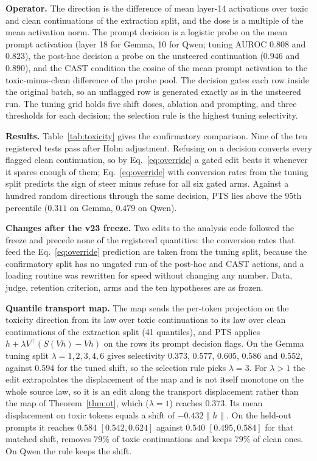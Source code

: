 \textbf{Operator.} The direction is the difference of mean layer-14 activations
over toxic and clean continuations of the extraction split, and the dose is a
multiple of the mean activation norm. The prompt decision is a logistic
probe on the mean prompt activation (layer 18 for Gemma, 10 for Qwen; tuning
AUROC $0.808$ and $0.823$), the post-hoc decision a probe on the unsteered
continuation ($0.946$ and $0.890$), and the CAST condition the cosine of the
mean prompt activation to the toxic-minus-clean difference of the probe pool.
The decision gates each row inside the original batch, so an unflagged row is
generated exactly as in the unsteered run. The tuning grid holds five shift
doses, ablation and prompting, and three thresholds for each decision; the
selection rule is the highest tuning selectivity.

\textbf{Results.} Table~\ref{tab:toxicity} gives the confirmatory comparison.
Nine of the ten registered tests pass after Holm adjustment. Refusing on a decision
converts every flagged clean continuation, so by Eq.~\eqref{eq:override} a
gated edit beats it whenever it spares enough of them; Eq.~\eqref{eq:override}
with conversion rates from the tuning split predicts the sign of steer minus
refuse for all six gated arms. Against a hundred random directions through the
same decision, PTS lies above the 95th percentile ($0.311$ on Gemma, $0.479$ on
Qwen).

\textbf{Changes after the v23 freeze.} Two edits to the analysis code followed
the freeze and precede none of the registered quantities: the conversion rates
that feed the Eq.~\eqref{eq:override} prediction are taken from the tuning
split, because the confirmatory split has no ungated run of the post-hoc and
CAST actions, and a loading routine was rewritten for speed without changing
any number. Data, judge, retention criterion, arms and the ten hypotheses are
as frozen.

\textbf{Quantile transport map.} The map sends the per-token projection on the
toxicity direction from its law over toxic continuations to its law over clean
continuations of the extraction split (41 quantiles), and PTS applies
$h+\lambda V^\top(S(Vh)-Vh)$ on the rows its prompt decision flags. On the
Gemma tuning split $\lambda=1,2,3,4,6$ gives selectivity $0.373$, $0.577$,
$0.605$, $0.586$ and $0.552$, against $0.594$ for the tuned shift, so the
selection rule picks $\lambda=3$. For $\lambda>1$ the edit extrapolates the
displacement of the map and is not itself monotone on the whole source law, so
it is an edit along the transport displacement rather than the map of
Theorem~\ref{thm:ot}, which ($\lambda=1$) reaches $0.373$. Its mean displacement on toxic
tokens equals a shift of $-0.432\lVert h\rVert$. On the held-out prompts it
reaches $0.584$ $[0.542, 0.624]$ against $0.540$ $[0.495, 0.584]$ for that
matched shift, removes $79\%$ of toxic continuations and keeps $79\%$ of clean
ones. On Qwen the rule keeps the shift.

